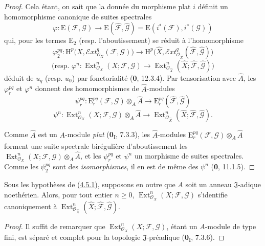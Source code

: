\begin{proof}
Cela étant, on sait que la donnée du morphisme plat $i$ définit un
homomorphisme canonique de suites spectrales
\[
\varphi:\mathrm E(\mathcal F,\mathcal G)\longrightarrow
\mathrm E(\widehat{\mathcal F},\widehat{\mathcal G})
=\mathrm E(i^*(\mathcal F),i^*(\mathcal G))
\]
qui, pour les termes $\mathrm E_2$ (resp. l'aboutissement) se réduit à
l'homomorphisme
\[
\varphi_2^{pq}:\mathrm H^p\bigl(X,
\mathcal{E}\!xt^q_{\mathcal O_X}(\mathcal F,\mathcal G)\bigr)
\longrightarrow
\mathrm H^p\bigl(\widehat X,
\mathcal{E}\!xt^q_{\mathcal O_{\widehat X}}
(\widehat{\mathcal F},\widehat{\mathcal G})\bigr)
\]
\[
\text{(resp. }\varphi^n:\operatorname{Ext}^n_{\mathcal O_X}
(X;\mathcal F,\mathcal G)\longrightarrow
\operatorname{Ext}^n_{\mathcal O_{\widehat X}}
(\widehat X;\widehat{\mathcal F},\widehat{\mathcal G})\text{)}
\]
déduit de $u_q$ (resp. $u_0$) par fonctorialité (\textbf{0}, 12.3.4). Par
tensorisation avec $\widehat A$, les $\varphi_r^{pq}$ et $\varphi^n$ donnent
des homomorphismes de $\widehat A$-modules
\[
\psi_r^{pq}:\mathrm E_r^{pq}(\mathcal F,\mathcal G)
\otimes_A\widehat A\longrightarrow
\mathrm E_r^{pq}(\widehat{\mathcal F},\widehat{\mathcal G})
\]
\[
\psi^n:\operatorname{Ext}^n_{\mathcal O_X}(X;\mathcal F,\mathcal G)
\otimes_A\widehat A\longrightarrow
\operatorname{Ext}^n_{\mathcal O_{\widehat X}}
(\widehat X;\widehat{\mathcal F},\widehat{\mathcal G}).
\]

Comme $\widehat A$ est un $A$-module \emph{plat} (\textbf{0}\textsubscript{I}, 7.3.3), les
$\widehat A$-modules
$\mathrm E_r^{pq}(\mathcal F,\mathcal G)\otimes_A\widehat A$ forment une
suite spectrale birégulière d'aboutissement les
$\operatorname{Ext}^n_{\mathcal O_X}(X;\mathcal F,\mathcal G)\otimes_A\widehat A$, et les
$\psi_r^{pq}$ et $\psi^n$ un morphisme de suites spectrales. Comme les
$\psi_2^{pq}$ sont des \emph{isomorphismes}, il en est de même des $\psi^n$
(\textbf{0}, 11.1.5).
\end{proof}

\begin{corollary}[4.5.2]
\label{III.4.5.2-fr}
Sous les hypothèses de \textup{(\hyperref[III.4.5.1-fr]{4.5.1})}, supposons en outre
que $A$ soit un anneau $\mathfrak J$-adique noethérien. Alors, pour tout
entier $n\geq0$, $\operatorname{Ext}^n_{\mathcal O_X}(X;\mathcal F,\mathcal G)$
s'identifie canoniquement à
$\operatorname{Ext}^n_{\mathcal O_{\widehat X}}
(\widehat X;\widehat{\mathcal F},\widehat{\mathcal G})$.
\end{corollary}

\begin{proof}
Il suffit de remarquer que $\operatorname{Ext}^n_{\mathcal O_X}
(X;\mathcal F,\mathcal G)$, étant un $A$-module de type fini, est séparé et
complet pour la topologie $\mathfrak J$-préadique (\textbf{0}\textsubscript{I}, 7.3.6).
\end{proof}

